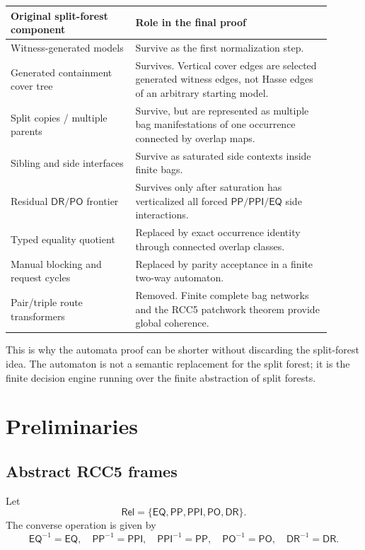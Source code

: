 \documentclass[11pt]{article}
\newcommand{\Rel}{\mathsf{Rel}}
\newcommand{\EQ}{\mathsf{EQ}}
\newcommand{\PP}{\mathsf{PP}}
\newcommand{\PPI}{\mathsf{PPI}}
\newcommand{\PO}{\mathsf{PO}}
\newcommand{\DR}{\mathsf{DR}}
\begin{document}
\begin{center}
\begin{tabular}{p{0.35\linewidth}p{0.55\linewidth}}
\toprule
Original split-forest component & Role in the final proof\\
\midrule
Witness-generated models & Survive as the first normalization step.\\
Generated containment cover tree & Survives.  Vertical cover edges are selected generated witness edges, not Hasse edges of an arbitrary starting model.\\
Split copies / multiple parents & Survive, but are represented as multiple bag manifestations of one occurrence connected by overlap maps.\\
Sibling and side interfaces & Survive as saturated side contexts inside finite bags.\\
Residual $\DR/\PO$ frontier & Survives only after saturation has verticalized all forced $\PP/\PPI/\EQ$ side interactions.\\
Typed equality quotient & Replaced by exact occurrence identity through connected overlap classes.\\
Manual blocking and request cycles & Replaced by parity acceptance in a finite two-way automaton.\\
Pair/triple route transformers & Removed.  Finite complete bag networks and the RCC5 patchwork theorem provide global coherence.\\
\bottomrule
\end{tabular}
\end{center}

This is why the automata proof can be shorter without discarding the split-forest idea.  The automaton is not a semantic replacement for the split forest; it is the finite decision engine running over the finite abstraction of split forests.

\section{Preliminaries}

\subsection{Abstract RCC5 frames}

Let
\[
\Rel=\{\EQ,\PP,\PPI,\PO,\DR\}.
\]
The converse operation is given by
\[
\EQ^{-1}=\EQ,\quad \PP^{-1}=\PPI,\quad \PPI^{-1}=\PP,
\quad \PO^{-1}=\PO,
\quad \DR^{-1}=\DR.
\]
\end{document}
